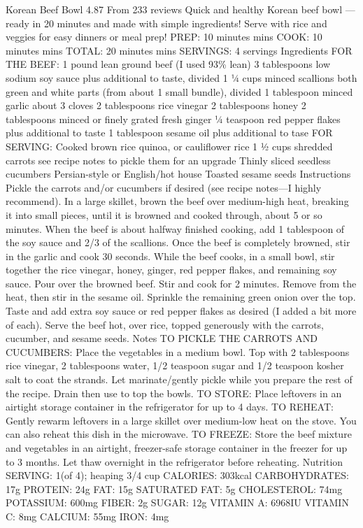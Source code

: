Korean Beef Bowl 4.87 From 233 reviews Quick and healthy Korean beef bowl — ready in 20 minutes and made with simple ingredients! Serve with rice and veggies for easy dinners or meal prep! PREP: 10 minutes mins COOK: 10 minutes mins TOTAL: 20 minutes mins SERVINGS: 4 servings Ingredients FOR THE BEEF: 1 pound lean ground beef (I used 93\% lean) 3 tablespoons low sodium soy sauce plus additional to taste, divided 1 ¼ cups minced scallions both green and white parts (from about 1 small bundle), divided 1 tablespoon minced garlic about 3 cloves 2 tablespoons rice vinegar 2 tablespoons honey 2 tablespoons minced or finely grated fresh ginger ¼ teaspoon red pepper flakes plus additional to taste 1 tablespoon sesame oil plus additional to tase FOR SERVING: Cooked brown rice quinoa, or cauliflower rice 1 ½ cups shredded carrots see recipe notes to pickle them for an upgrade Thinly sliced seedless cucumbers Persian-style or English/hot house Toasted sesame seeds Instructions Pickle the carrots and/or cucumbers if desired (see recipe notes—I highly recommend). In a large skillet, brown the beef over medium-high heat, breaking it into small pieces, until it is browned and cooked through, about 5 or so minutes. When the beef is about halfway finished cooking, add 1 tablespoon of the soy sauce and 2/3 of the scallions. Once the beef is completely browned, stir in the garlic and cook 30 seconds. While the beef cooks, in a small bowl, stir together the rice vinegar, honey, ginger, red pepper flakes, and remaining soy sauce. Pour over the browned beef. Stir and cook for 2 minutes. Remove from the heat, then stir in the sesame oil. Sprinkle the remaining green onion over the top. Taste and add extra soy sauce or red pepper flakes as desired (I added a bit more of each). Serve the beef hot, over rice, topped generously with the carrots, cucumber, and sesame seeds. Notes TO PICKLE THE CARROTS AND CUCUMBERS: Place the vegetables in a medium bowl. Top with 2 tablespoons rice vinegar, 2 tablespoons water, 1/2 teaspoon sugar and 1/2 teaspoon kosher salt to coat the strands. Let marinate/gently pickle while you prepare the rest of the recipe. Drain then use to top the bowls. TO STORE: Place leftovers in an airtight storage container in the refrigerator for up to 4 days. TO REHEAT: Gently rewarm leftovers in a large skillet over medium-low heat on the stove. You can also reheat this dish in the microwave. TO FREEZE: Store the beef mixture and vegetables in an airtight, freezer-safe storage container in the freezer for up to 3 months. Let thaw overnight in the refrigerator before reheating. Nutrition SERVING: 1(of 4); heaping 3/4 cup CALORIES: 303kcal CARBOHYDRATES: 17g PROTEIN: 24g FAT: 15g SATURATED FAT: 5g CHOLESTEROL: 74mg POTASSIUM: 600mg FIBER: 2g SUGAR: 12g VITAMIN A: 6968IU VITAMIN C: 8mg CALCIUM: 55mg IRON: 4mg
\par

